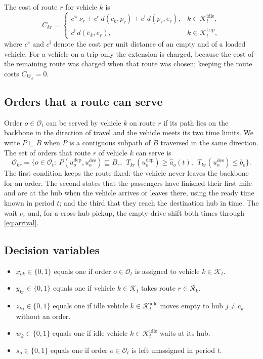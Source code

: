 \documentclass[12pt]{article}
\theoremstyle{plain}
\theoremstyle{definition}
\newcommand{\dep}{u^{\mathrm{dep}}}
\newcommand{\des}{u^{\mathrm{des}}}
\newcommand{\Kidle}{\mathcal{K}^{\mathrm{idle}}_t}
\newcommand{\Ktrip}{\mathcal{K}^{\mathrm{trip}}_t}
\newcommand{\Kdec}{\mathcal{K}_t}
\newcommand{\subpath}{\sqsubseteq}
\begin{document}
The cost of route $r$ for vehicle $k$ is
\begin{equation}\label{eq:routecost}
C_{kr}=
\begin{cases}
c^{\mathrm{w}}\,\nu_r+c^{\mathrm{e}}\,d(c_k,p_r)+c^{\mathrm{l}}\,d(p_r,e_r), & k\in\Kidle,\\[2pt]
c^{\mathrm{l}}\,d(\bar e_k,e_r), & k\in\Ktrip,
\end{cases}
\end{equation}
where $c^{\mathrm{e}}$ and $c^{\mathrm{l}}$ denote the cost per unit distance of an empty and of a loaded vehicle. For a vehicle on a trip only the extension is charged, because the cost of the remaining route was charged when that route was chosen; keeping the route costs $C_{k\bar r_k}=0$.

\subsection{Orders that a route can serve}

Order $o\in\mathcal{O}_t$ can be served by vehicle $k$ on route $r$ if its path lies on the backbone in the direction of travel and the vehicle meets its two time limits. We write $P\subpath B$ when $P$ is a contiguous subpath of $B$ traversed in the same direction. The set of orders that route $r$ of vehicle $k$ can serve is
\begin{equation}\label{eq:okr}
\mathcal{O}_{kr}=\bigl\{o\in\mathcal{O}_t:\ P(\dep_o,\des_o)\subpath B_r,\ \ T_{kr}(\dep_o)\ge \hat a_o(t),\ \ T_{kr}(\des_o)\le b_o\bigr\}.
\end{equation}
The first condition keeps the route fixed: the vehicle never leaves the backbone for an order. The second states that the passengers have finished their first mile and are at the hub when the vehicle arrives or leaves there, using the ready time known in period $t$; and the third that they reach the destination hub in time. The wait $\nu_r$ and, for a cross-hub pickup, the empty drive shift both times through \eqref{eq:arrival}.

\subsection{Decision variables}

\begin{itemize}
    \item $x_{ok}\in\{0,1\}$ equals one if order $o\in\mathcal{O}_t$ is assigned to vehicle $k\in\Kdec$.
    \item $y_{kr}\in\{0,1\}$ equals one if vehicle $k\in\Kdec$ takes route $r\in\mathcal{R}_k$.
    \item $z_{kj}\in\{0,1\}$ equals one if idle vehicle $k\in\Kidle$ moves empty to hub $j\neq c_k$ without an order.
    \item $w_k\in\{0,1\}$ equals one if idle vehicle $k\in\Kidle$ waits at its hub.
    \item $s_o\in\{0,1\}$ equals one if order $o\in\mathcal{O}_t$ is left unassigned in period $t$.
\end{itemize}
\end{document}
